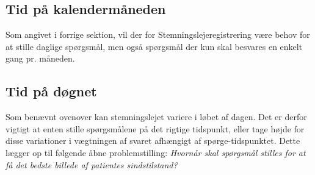 \subsection{Tid på kalendermåneden}
Som angivet i forrige sektion, vil der for Stemningslejeregistrering være behov for at stille daglige spørgsmål, men også spørgsmål der kun skal besvares en enkelt gang pr. måneden.

\subsection{Tid på døgnet}
Som benævnt ovenover kan stemningslejet variere i løbet af dagen.
Det er derfor vigtigt at enten stille spørgsmålene på det rigtige tidspunkt, eller tage højde for disse variationer i vægtningen af svaret afhængigt af spørge-tidspunktet.
Dette lægger op til følgende åbne problemstilling: \textit{Hvornår skal spørgsmål stilles for at få det bedste billede af patientes sindstilstand?}
